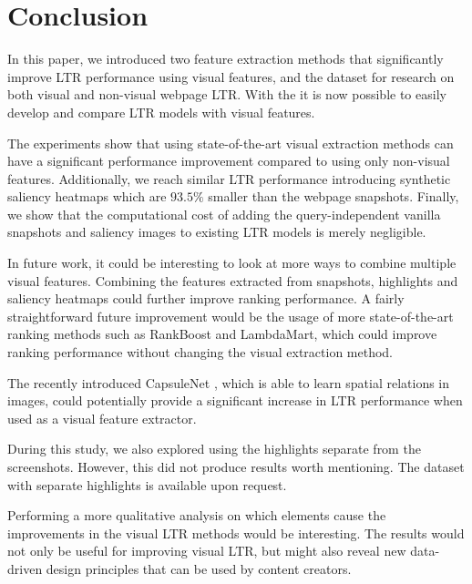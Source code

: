 
\section{Conclusion}
In this paper, we introduced two feature extraction methods that significantly improve \ac{LTR} performance using visual features, and the \datasetname{} dataset for research on both visual and non-visual webpage \ac{LTR}.
With the \datasetname{} it is now possible to easily develop and compare \ac{LTR} models with visual features. 

The experiments show that using state-of-the-art visual extraction methods can have a significant performance improvement compared to using only non-visual features. Additionally, we reach similar \ac{LTR} performance introducing synthetic saliency heatmaps which are $93.5\%$ smaller than the webpage snapshots. Finally, we show that the computational cost of adding the query-independent vanilla snapshots and saliency images to existing \ac{LTR} models is merely negligible.





In future work, it could be interesting to look at more ways to combine multiple visual features. Combining the features extracted from snapshots, highlights and saliency heatmaps could further improve ranking performance. 
A fairly straightforward future improvement would be the usage of more state-of-the-art ranking methods such as RankBoost and LambdaMart, which could improve ranking performance without changing the visual extraction method.

The recently introduced CapsuleNet \cite{sabour2017dynamic}, which is able to learn spatial relations in images, could potentially provide a significant increase in \ac{LTR} performance when used as a visual feature extractor.  

During this study, we also explored using the highlights separate from the screenshots. 
However, this did not produce results worth mentioning. 
The dataset with separate highlights is available upon request. 
\fi

Performing a more qualitative analysis on which elements cause the improvements in the visual \ac{LTR} methods would be interesting. 
The results would not only be useful for improving visual \ac{LTR}, but might also reveal new data-driven design principles that can be used by content creators. 
